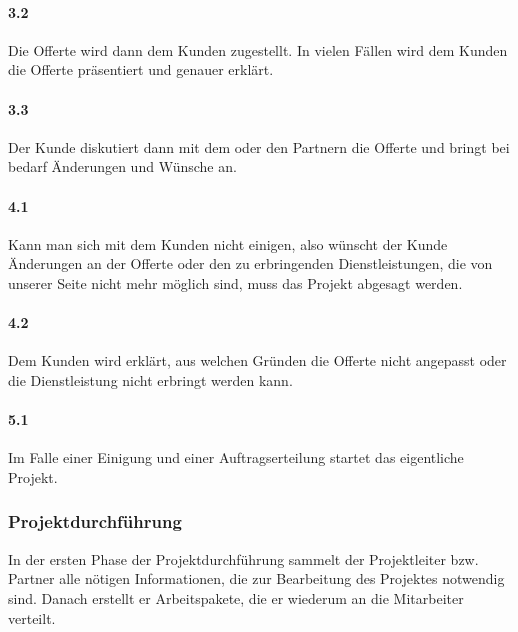 \paragraph{3.2}
Die Offerte wird dann dem Kunden zugestellt. In vielen Fällen wird dem Kunden
die Offerte präsentiert und genauer erklärt.

\paragraph{3.3}
Der Kunde diskutiert dann mit dem oder den Partnern die Offerte und bringt
bei bedarf Änderungen und Wünsche an.

\paragraph{4.1}
Kann man sich mit dem Kunden nicht einigen, also wünscht der Kunde Änderungen
an der Offerte oder den zu erbringenden Dienstleistungen, die von unserer Seite
nicht mehr möglich sind, muss das Projekt abgesagt werden.

\paragraph{4.2}
Dem Kunden wird erklärt, aus welchen Gründen die Offerte nicht angepasst oder
die Dienstleistung nicht erbringt werden kann.

\paragraph{5.1}
Im Falle einer Einigung und einer Auftragserteilung startet das eigentliche
Projekt.

\subsubsection{Projektdurchführung}
In der ersten Phase der Projektdurchführung sammelt der Projektleiter bzw.
Partner alle nötigen Informationen, die zur Bearbeitung des Projektes notwendig sind.
Danach erstellt er Arbeitspakete, die er wiederum an die Mitarbeiter verteilt.

